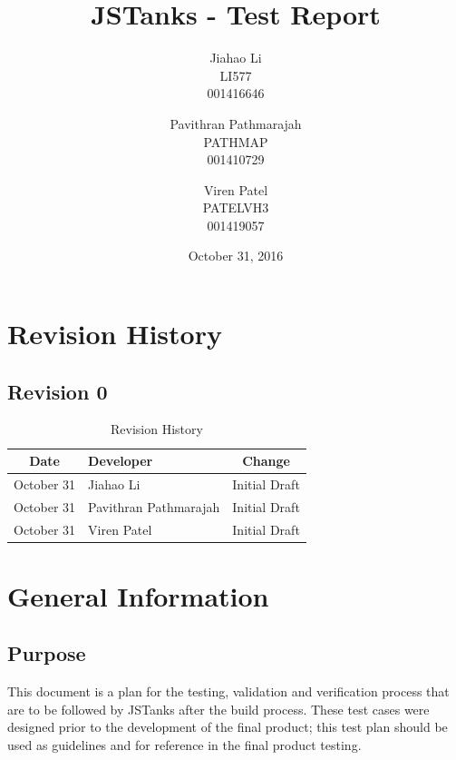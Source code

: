 \documentclass{article}
\begin{document}
\newpage
\title{JSTanks - Test Report}
\date{October 31, 2016}
\author{Jiahao Li\\LI577\\001416646\and Pavithran Pathmarajah\\PATHMAP\\
001410729 \and Viren Patel\\PATELVH3\\001419057}

\maketitle

\newpage
{}
\tableofcontents
\newpage
\listoftables

\newpage
\listoffigures

\newpage
\section{Revision History}
\subsection{Revision 0}
\begin{table}[H]
\caption{Revision History}
	\begin{tabularx}{\textwidth}{cXc}
		\toprule
		Date & Developer & Change\\
		\midrule
		October 31&Jiahao Li &Initial Draft \\
		October 31&Pavithran Pathmarajah &Initial Draft\\
		October 31&Viren Patel  &Initial Draft\\
	\end{tabularx}
\end{table}


\section{General Information}
\subsection{Purpose}
This document is a plan for the testing, validation and verification process 
that are to be followed by JSTanks after the build process. These test cases 
were designed prior to the development of the final product; this test plan 
should be used as guidelines and for reference in the final product testing. 
\end{document}
